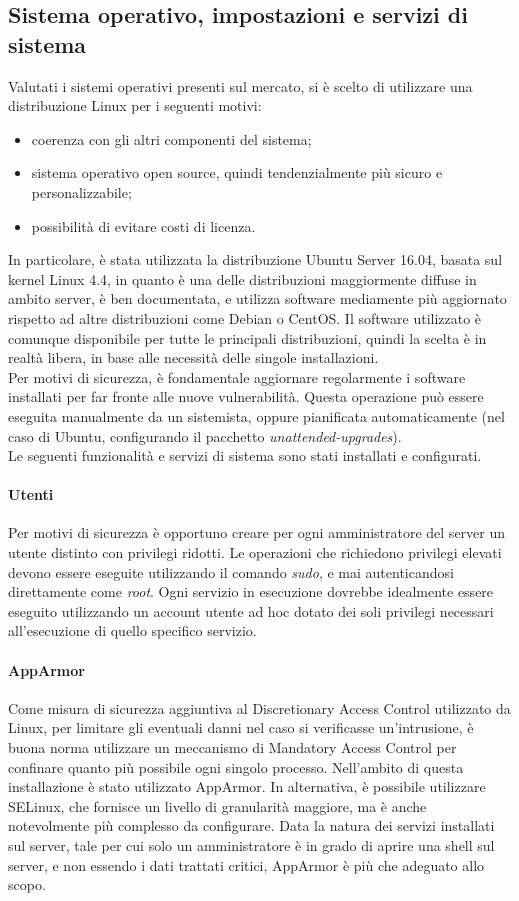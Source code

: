 \subsection{Sistema operativo, impostazioni e servizi di sistema}
Valutati i sistemi operativi presenti sul mercato, si è scelto di utilizzare una distribuzione Linux per i seguenti motivi:
\begin{itemize}
 \item coerenza con gli altri componenti del sistema;
 \item sistema operativo open source, quindi tendenzialmente più sicuro e personalizzabile;
 \item possibilità di evitare costi di licenza.
\end{itemize}
In particolare, è stata utilizzata la distribuzione Ubuntu Server 16.04, basata sul kernel Linux 4.4, in quanto è una delle distribuzioni maggiormente diffuse in ambito server, è ben documentata, e utilizza software mediamente più aggiornato rispetto ad altre distribuzioni come Debian o CentOS.
Il software utilizzato è comunque disponibile per tutte le principali distribuzioni, quindi la scelta è in realtà libera, in base alle necessità delle singole installazioni.
\\Per motivi di sicurezza, è fondamentale aggiornare regolarmente i software installati per far fronte alle nuove vulnerabilità.
Questa operazione può essere eseguita manualmente da un sistemista, oppure pianificata automaticamente (nel caso di Ubuntu, configurando il pacchetto \textit{unattended-upgrades}).
\\Le seguenti funzionalità e servizi di sistema sono stati installati e configurati.
\paragraph{Utenti}
Per motivi di sicurezza è opportuno creare per ogni amministratore del server un utente distinto con privilegi ridotti.
Le operazioni che richiedono privilegi elevati devono essere eseguite utilizzando il comando \textit{sudo}, e mai autenticandosi direttamente come \textit{root}.
Ogni servizio in esecuzione dovrebbe idealmente essere eseguito utilizzando un account utente ad hoc dotato dei soli privilegi necessari all'esecuzione di quello specifico servizio.
\paragraph{AppArmor}
Come misura di sicurezza aggiuntiva al Discretionary Access Control utilizzato da Linux, per limitare gli eventuali danni nel caso si verificasse un'intrusione, è buona norma utilizzare un meccanismo di Mandatory Access Control per confinare quanto più possibile ogni singolo processo.
Nell'ambito di questa installazione è stato utilizzato AppArmor. In alternativa, è possibile utilizzare SELinux, che fornisce un livello di granularità maggiore, ma è anche notevolmente più complesso da configurare.
Data la natura dei servizi installati sul server, tale per cui solo un amministratore è in grado di aprire una shell sul server, e non essendo i dati trattati critici, AppArmor è più che adeguato allo scopo.
